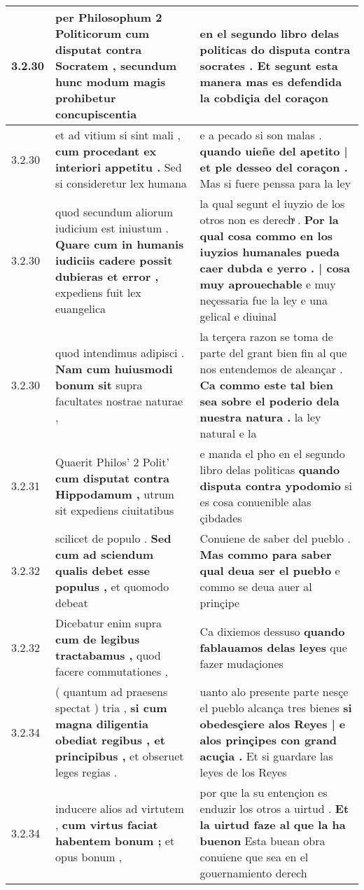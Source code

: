 \begin{tabular}{|p{1cm}|p{6.5cm}|p{6.5cm}|}
3.2.30 & per Philosophum 2 Politicorum \textbf{ cum disputat contra Socratem , } secundum hunc modum magis prohibetur concupiscentia & en el segundo libro delas politicas \textbf{ do disputa contra socrates . } Et segunt esta manera mas es defendida la cobdiçia del coraçon \\\hline
3.2.30 & et ad vitium si sint mali , \textbf{ cum procedant ex interiori appetitu . } Sed si consideretur lex humana & e a pecado si son malas . \textbf{ quando uieñe del apetito | et ple desseo del coraçon . } Mas si fuere penssa para la ley \\\hline
3.2.30 & quod secundum aliorum iudicium est iniustum . \textbf{ Quare cum in humanis iudiciis cadere possit dubieras et error , } expediens fuit lex euangelica & la qual segunt el iuyzio de los otros non es derechͣ . \textbf{ Por la qual cosa commo en los iuyzios humanales pueda caer dubda e yerro . | cosa muy aprouechable } e muy neçessaria fue la ley e una gelical e diuinal \\\hline
3.2.30 & quod intendimus adipisci . \textbf{ Nam cum huiusmodi bonum sit } supra facultates nostrae naturae , & la terçera razon se toma de parte del grant bien fin al que nos entendemos de aleançar . \textbf{ Ca commo este tal bien sea sobre el poderio dela nuestra natura . } la ley natural e la \\\hline
3.2.31 & Quaerit Philos’ 2 Polit’ \textbf{ cum disputat contra Hippodamum , } utrum sit expediens ciuitatibus & e manda el pho en el segundo libro delas politicas \textbf{ quando disputa contra ypodomio } si es cosa conuenible alas çibdades \\\hline
3.2.32 & scilicet de populo . \textbf{ Sed cum ad sciendum qualis debet esse populus , } et quomodo debeat & Conuiene de saber del pueblo . \textbf{ Mas commo para saber qual deua ser el puebło } e commo se deua auer al prinçipe \\\hline
3.2.32 & Dicebatur enim supra \textbf{ cum de legibus tractabamus , } quod facere commutationes , & Ca dixiemos dessuso \textbf{ quando fablauamos delas leyes } que fazer mudaçiones \\\hline
3.2.34 & ( quantum ad praesens spectat ) tria , \textbf{ si cum magna diligentia obediat regibus , et principibus , } et obseruet leges regias . & uanto alo presente parte nesçe el pueblo alcança tres bienes \textbf{ si obedesçiere alos Reyes | e alos prinçipes con grand acuçia . } Et si guardare las leyes de los Reyes \\\hline
3.2.34 & inducere alios ad virtutem , \textbf{ cum virtus faciat habentem bonum ; } et opus bonum , & por que la su entençion es enduzir los otros a uirtud . \textbf{ Et la uirtud faze al que la ha buenon } Esta buean obra conuiene que sea en el gouernamiento derech \\\hline

\end{tabular}

